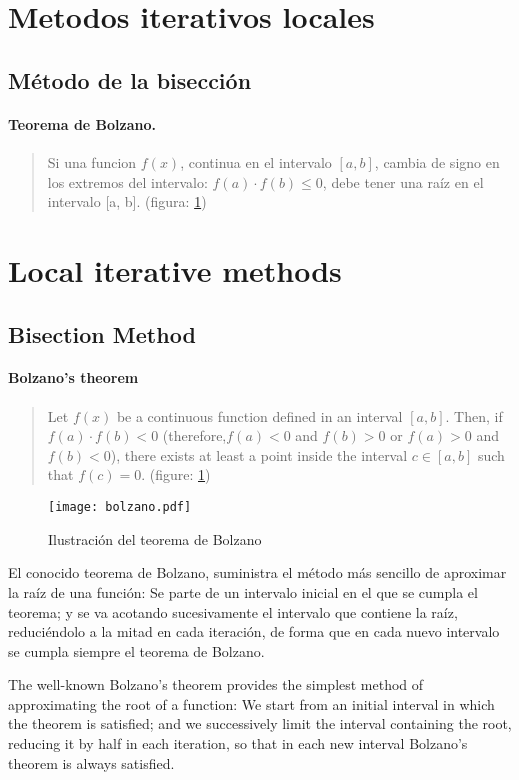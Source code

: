 \begin{paracol}{2}
\section{Metodos iterativos locales}
\subsection{Método de la bisección}
\paragraph*{Teorema de Bolzano.}
\begin{quote}
Si una funcion $f(x)$, continua en el intervalo $[a, b]$, cambia de signo en los extremos del intervalo: $f(a)\cdot f(b) \le 0$, debe tener una raíz en el intervalo [a, b]. (figura: \ref{fig:bolzano}) 
\end{quote}

\switchcolumn
\section{Local iterative methods}
\subsection{Bisection Method}
\paragraph*{Bolzano's theorem}
\begin{quote}
    Let $f(x)$ be a continuous function defined in an interval $[a, b]$. Then, if $f(a)\cdot f(b)<0$
(therefore,$f(a)<0$ and $f(b)>0$ or $f(a)>0$ and $f(b)<0$), there exists at least a point inside the interval $c \in [a,b]$ such that $f(c)=0$. (figure: \ref{fig:bolzano})
\end{quote}
\end{paracol}

\begin{figure}[h]
\centering
\texttt{[image: bolzano.pdf]}
\caption{Ilustración del teorema de Bolzano}
\label{fig:bolzano}
\end{figure}
\begin{paracol}{2}
El conocido teorema de Bolzano, suministra el método más sencillo de aproximar la raíz de una función: Se parte de un intervalo inicial en el que se cumpla el teorema; y se va acotando sucesivamente el intervalo que contiene la raíz, reduciéndolo a la mitad en cada iteración, de forma que en cada nuevo intervalo se cumpla siempre el teorema de Bolzano.
\switchcolumn

The well-known Bolzano's theorem provides the simplest method of approximating the root of a function: We start from an initial interval in which the theorem is satisfied; and we successively limit the interval containing the root, reducing it by half in each iteration, so that in each new interval Bolzano's theorem is always satisfied.

\end{paracol}

